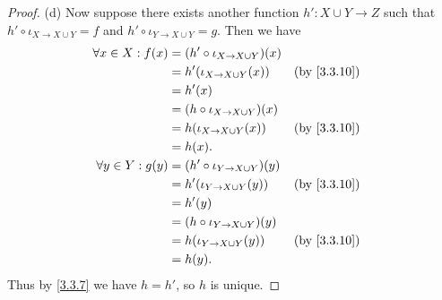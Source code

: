 \begin{proof}{(d)}
  Now suppose there exists another function \(h' : X \cup Y \to Z\) such that \(h' \circ \iota_{X \to X \cup Y} = f\) and \(h' \circ \iota_{Y \to X \cup Y} = g\).
  Then we have
  \begin{align*}
    \forall x \in X : f(x) & = (h' \circ \iota_{X \to X \cup Y})(x)                  \\
                           & = h'(\iota_{X \to X \cup Y}(x))        &  & \by{3.3.10} \\
                           & = h'(x)                                                 \\
                           & = (h \circ \iota_{X \to X \cup Y})(x)                   \\
                           & = h(\iota_{X \to X \cup Y}(x))         &  & \by{3.3.10} \\
                           & = h(x).                                                 \\
    \forall y \in Y : g(y) & = (h' \circ \iota_{Y \to X \cup Y})(y)                  \\
                           & = h'(\iota_{Y \to X \cup Y}(y))        &  & \by{3.3.10} \\
                           & = h'(y)                                                 \\
                           & = (h \circ \iota_{Y \to X \cup Y})(y)                   \\
                           & = h(\iota_{Y \to X \cup Y}(y))         &  & \by{3.3.10} \\
                           & = h(y).
  \end{align*}
  Thus by \cref{3.3.7} we have \(h = h'\), so \(h\) is unique.
\end{proof}
